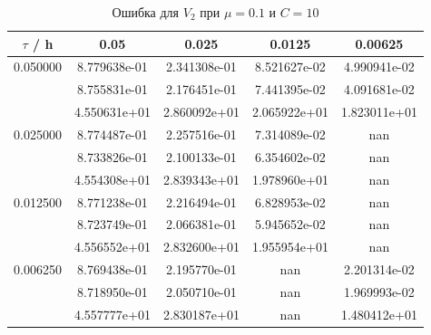 \documentclass[specialist,subf,href,colorlinks=true,12pt
,times,mtpro,specialist
]{disser}
\begin{document}
\begin{table}[H]
\small
\caption{Ошибка для $V_2$ при $\mu=0.1$ и $C = 10$}
\begin{center}
\begin{tabular}{|c|c|c|c|c|}
\hline
$\tau$ / h & 0.05 & 0.025 & 0.0125 & 0.00625 \\
\hline
0.050000 & 8.779638e-01  & 2.341308e-01  & 8.521627e-02  & 4.990941e-02 \\
 & 8.755831e-01  & 2.176451e-01  & 7.441395e-02  & 4.091681e-02 \\
 & 4.550631e+01  & 2.860092e+01  & 2.065922e+01  & 1.823011e+01 \\
\hline
0.025000 & 8.774487e-01  & 2.257516e-01  & 7.314089e-02  & nan \\
 & 8.733826e-01  & 2.100133e-01  & 6.354602e-02  & nan \\
 & 4.554308e+01  & 2.839343e+01  & 1.978960e+01  & nan \\
\hline
0.012500 & 8.771238e-01  & 2.216494e-01  & 6.828953e-02  & nan \\
 & 8.723749e-01  & 2.066381e-01  & 5.945652e-02  & nan \\
 & 4.556552e+01  & 2.832600e+01  & 1.955954e+01  & nan \\
\hline
0.006250 & 8.769438e-01  & 2.195770e-01  & nan  & 2.201314e-02 \\
 & 8.718950e-01  & 2.050710e-01  & nan  & 1.969993e-02 \\
 & 4.557777e+01  & 2.830187e+01  & nan  & 1.480412e+01 \\
\hline
\end{tabular}
\end{center}
\end{table}
\end{document}
